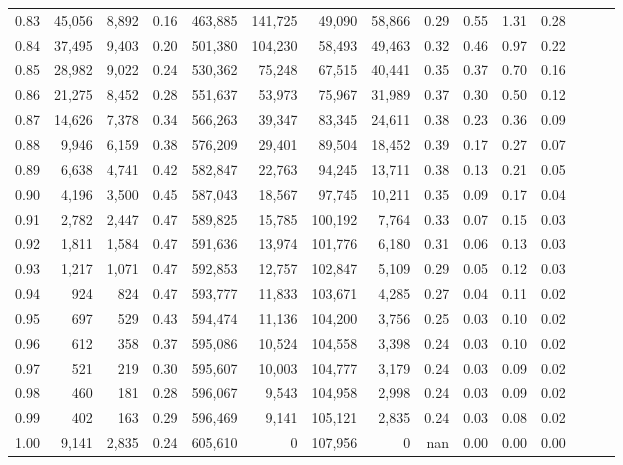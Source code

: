 \begin{tabular}{rrrrrrrrrrrrrrr}
0.83 &  45,056 &  8,892 &  0.16 &  463,885 &  141,725 &   49,090 &   58,866 &  0.29 &  0.55 &  1.31 &      0.28 \\
0.84 &  37,495 &  9,403 &  0.20 &  501,380 &  104,230 &   58,493 &   49,463 &  0.32 &  0.46 &  0.97 &      0.22 \\
0.85 &  28,982 &  9,022 &  0.24 &  530,362 &   75,248 &   67,515 &   40,441 &  0.35 &  0.37 &  0.70 &      0.16 \\
0.86 &  21,275 &  8,452 &  0.28 &  551,637 &   53,973 &   75,967 &   31,989 &  0.37 &  0.30 &  0.50 &      0.12 \\
0.87 &  14,626 &  7,378 &  0.34 &  566,263 &   39,347 &   83,345 &   24,611 &  0.38 &  0.23 &  0.36 &      0.09 \\
0.88 &   9,946 &  6,159 &  0.38 &  576,209 &   29,401 &   89,504 &   18,452 &  0.39 &  0.17 &  0.27 &      0.07 \\
0.89 &   6,638 &  4,741 &  0.42 &  582,847 &   22,763 &   94,245 &   13,711 &  0.38 &  0.13 &  0.21 &      0.05 \\
0.90 &   4,196 &  3,500 &  0.45 &  587,043 &   18,567 &   97,745 &   10,211 &  0.35 &  0.09 &  0.17 &      0.04 \\
0.91 &   2,782 &  2,447 &  0.47 &  589,825 &   15,785 &  100,192 &    7,764 &  0.33 &  0.07 &  0.15 &      0.03 \\
0.92 &   1,811 &  1,584 &  0.47 &  591,636 &   13,974 &  101,776 &    6,180 &  0.31 &  0.06 &  0.13 &      0.03 \\
0.93 &   1,217 &  1,071 &  0.47 &  592,853 &   12,757 &  102,847 &    5,109 &  0.29 &  0.05 &  0.12 &      0.03 \\
0.94 &     924 &    824 &  0.47 &  593,777 &   11,833 &  103,671 &    4,285 &  0.27 &  0.04 &  0.11 &      0.02 \\
0.95 &     697 &    529 &  0.43 &  594,474 &   11,136 &  104,200 &    3,756 &  0.25 &  0.03 &  0.10 &      0.02 \\
0.96 &     612 &    358 &  0.37 &  595,086 &   10,524 &  104,558 &    3,398 &  0.24 &  0.03 &  0.10 &      0.02 \\
0.97 &     521 &    219 &  0.30 &  595,607 &   10,003 &  104,777 &    3,179 &  0.24 &  0.03 &  0.09 &      0.02 \\
0.98 &     460 &    181 &  0.28 &  596,067 &    9,543 &  104,958 &    2,998 &  0.24 &  0.03 &  0.09 &      0.02 \\
0.99 &     402 &    163 &  0.29 &  596,469 &    9,141 &  105,121 &    2,835 &  0.24 &  0.03 &  0.08 &      0.02 \\
1.00 &   9,141 &  2,835 &  0.24 &  605,610 &        0 &  107,956 &        0 &   nan &  0.00 &  0.00 &      0.00 \\
\bottomrule
\end{tabular}
